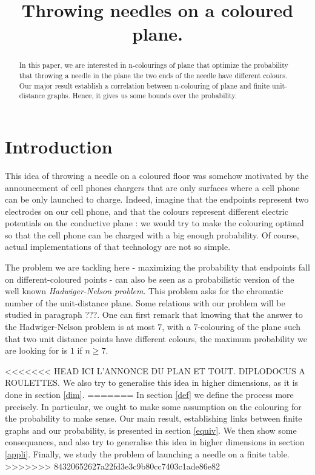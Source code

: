 \documentclass[a4paper,11pt]{article}
\title{Throwing needles on a coloured plane.}
\theoremstyle{definition}
\theoremstyle{remark}
\begin{document}
\maketitle

\begin{abstract}  In this paper, we are interested in n-colourings of plane
that optimize the probability that throwing a needle in the plane the two ends of the
needle have different colours. Our major result establish a correlation between
n-colouring of plane and finite unit-distance graphs. Hence, it gives us
some bounds over the probability.\end{abstract}

\section{Introduction}
This idea of throwing a needle on a coloured floor was somehow motivated by the announcement of cell phones chargers that are only surfaces where a cell phone can be only launched to charge. Indeed, imagine that the endpoints represent two electrodes on our cell phone, and that the colours represent different electric potentials on the conductive plane : we would try to make the colouring optimal so that the cell phone can be charged with a big enough probability. Of course, actual implementations of that technology are not so simple.

The problem we are tackling here - maximizing the probability that endpoints fall on different-coloured points - can also be seen as a probabilistic version of the well known \emph{Hadwiger-Nelson problem}. This problem asks for the chromatic number of the unit-distance plane. Some relations with our problem will be studied in paragraph ???. One can first remark that knowing that the answer to the Hadwiger-Nelson problem is at most $7$, with a $7$-colouring of the plane such that two unit distance points have different colours, the maximum probability we are looking for is $1$ if $n \geq 7$.

<<<<<<< HEAD
ICI L'ANNONCE DU PLAN ET TOUT. DIPLODOCUS A ROULETTES.
We also try to generalise this idea in higher dimensions, as it is done in section \ref{dim}.
=======
In section \ref{def} we define the process more precisely. In particular, we ought to make some assumption on the colouring for the probability to make sense. Our main result, establishing links between finite graphs and our probability, is presented in section \ref{equiv}. We then show some consequances, and also try to generalise this idea in higher dimensions in section \ref{appli}. Finally, we study the problem of launching a needle on a finite table.
>>>>>>> 84320652627a22fd3e3c9b80cc7403c1ade86e82
\end{document}
